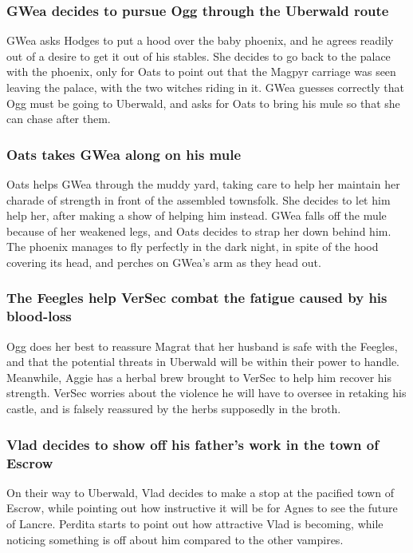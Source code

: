 \subsubsection{\Gls{GWea} decides to pursue \Gls{Ogg} through the Uberwald route}
\Gls{GWea} asks \Gls{Hodges} to put a hood over the baby phoenix, and he agrees readily out of a
desire to get it out of his stables. She decides to go back to the palace with the phoenix, only
for \Gls{Oats} to point out that the Magpyr carriage was seen leaving the palace, with the two
witches riding in it. \Gls{GWea} guesses correctly that \Gls{Ogg} must be going to Uberwald, and
asks for \Gls{Oats} to bring his mule so that she can chase after them.

\subsubsection{\Gls{Oats} takes \Gls{GWea} along on his mule}
\Gls{Oats} helps \Gls{GWea} through the muddy yard, taking care to help her maintain her charade of
strength in front of the assembled townsfolk. She decides to let him help her, after making a show
of helping him instead. \Gls{GWea} falls off the mule because of her weakened legs, and \Gls{Oats}
decides to strap her down behind him. The phoenix manages to fly perfectly in the dark night, in
spite of the hood covering its head, and perches on \Gls{GWea}'s arm as they head out.

\subsubsection{The Feegles help \Gls{VerSec} combat the fatigue caused by his blood-loss}
\Gls{Ogg} does her best to reassure \Gls{Magrat} that her husband is safe with the Feegles, and
that the potential threats in Uberwald will be within their power to handle. Meanwhile, \Gls{Aggie}
has a herbal brew brought to \Gls{VerSec} to help him recover his strength. \Gls{VerSec} worries
about the violence he will have to oversee in retaking his castle, and is falsely reassured by the
herbs supposedly in the broth.

\subsubsection{\Gls{Vlad} decides to show off his father's work in the town of Escrow}
On their way to Uberwald, \Gls{Vlad} decides to make a stop at the pacified town of Escrow, while
pointing out how instructive it will be for \Gls{Agnes} to see the future of Lancre. \Gls{Perdita}
starts to point out how attractive \Gls{Vlad} is becoming, while noticing something is off about him
compared to the other vampires.

